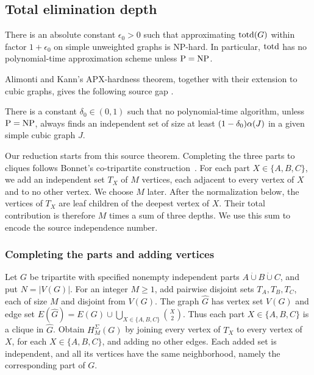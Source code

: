 \subsection{Total elimination depth}
\label{subsec:np-total-depth}

\begin{theorem}\label{thm:np-total-depth}
There is an absolute constant $\epsilon_0>0$ such that approximating
$\operatorname{totd}(G)$ within factor $1+\epsilon_0$ on simple unweighted graphs is
\textup{NP}-hard. In particular, $\operatorname{totd}$ has no polynomial-time approximation
scheme unless $\mathrm{P}=\mathrm{NP}$.
\end{theorem}

Alimonti and Kann's APX-hardness theorem, together with their
extension to cubic graphs, gives the following source gap
\cite[Theorem~3.2 and the final paragraph of Section~3]{AlimontiKann2000}.
\begin{theorem}
\label{thm:source-cubic-independent-set}
There is a constant $\delta_0\in(0,1)$ such that no polynomial-time
algorithm, unless $\mathrm{P}=\mathrm{NP}$, always finds an independent set of size
at least $(1-\delta_0)\alpha(J)$ in a given simple cubic graph $J$.
\end{theorem}

Our reduction starts from this source theorem. Completing the three
parts to cliques follows Bonnet's co-tripartite construction~\cite[Section~3.1]{BonnetTreewidth}.
For each part $X\in\{A,B,C\}$, we add an independent set $T_X$ of
$M$ vertices, each adjacent to every vertex of $X$ and to no other
vertex. We choose $M$ later. After the normalization below, the
vertices of $T_X$ are leaf children of the deepest vertex of $X$.
Their total contribution is therefore $M$ times a sum of three
depths. We use this sum to encode the source independence number.

\subsubsection{Completing the parts and adding vertices}

Let $G$ be tripartite with specified nonempty independent parts
$A\mathbin{\dot\cup}B\mathbin{\dot\cup}C$, and put $N=|V(G)|$.
For an integer $M\ge1$, add pairwise disjoint sets $T_A,T_B,T_C$,
each of size $M$ and disjoint from $V(G)$. The graph $\widehat G$
has vertex set $V(G)$ and edge set
$E(\widehat G)=E(G)\cup\bigcup_{X\in\{A,B,C\}}\binom X2$.
Thus each part $X\in\{A,B,C\}$ is a clique in $\widehat G$.
Obtain $H^{\Sigma}_M(G)$ by joining every vertex of $T_X$ to every
vertex of $X$, for each $X\in\{A,B,C\}$, and adding no other edges.
Each added set is independent, and all its vertices have the same
neighborhood, namely the corresponding part of $G$.

